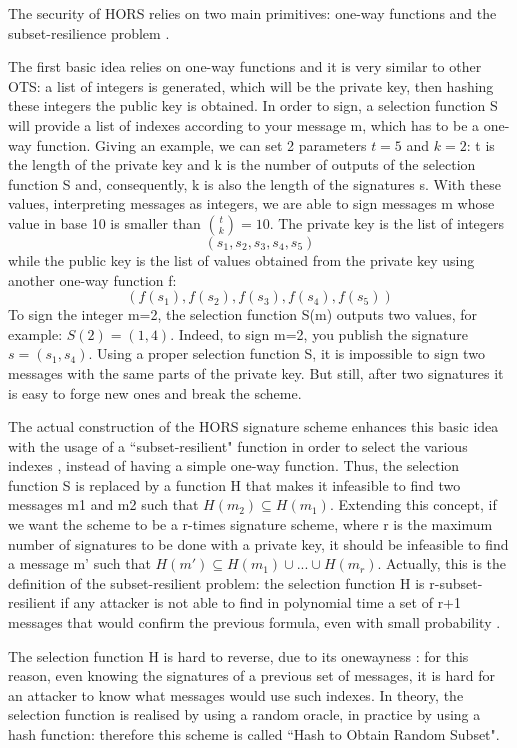 \documentclass[a4paper,12pt]{article}
\begin{document}
The security of HORS relies on two main primitives: one-way functions and the subset-resilience problem \cite{53_hbs}.

The first basic idea relies on one-way functions and it is very similar to other OTS: a list of integers is generated, which will be the private key, then hashing these integers the public key is obtained.
In order to sign, a selection function S will provide a list of indexes according to your message m, which has to be a one-way function.
Giving an example, we can set 2 parameters $t=5$ and $k=2$: t is the length of the private key and k is the number of outputs of the selection function S and, consequently, k is also the length of the signatures s.
With these values, interpreting messages as integers, we are able to sign messages m whose value in base 10 is smaller than $ {t \choose k} = 10 $.
The private key is the list of integers $$(s_{1}, s_{2}, s_{3}, s_{4}, s_{5})$$
while the public key is the list of values obtained from the private key using another one-way function f: $$(f(s_{1}), f(s_{2}), f(s_{3}),f(s_{4}),f(s_{5}))$$
To sign the integer m=2, the selection function S(m) outputs two values, for example: $S(2) = (1, 4)$. Indeed, to sign m=2, you publish the signature $s=(s_{1}, s_{4})$. Using a proper selection function S, it is impossible to sign two messages with the same parts of the private key. But still, after two signatures it is easy to forge new ones and break the scheme.

The actual construction of the HORS signature scheme enhances this basic idea with the usage of a ``subset-resilient" function in order to select the various indexes \cite{53_hbs}, instead of having a simple one-way function. Thus, the selection function S is replaced by a function H that makes it infeasible to find two messages m1 and m2 such that $H(m_{2}) \subseteq H(m_{1})$.
Extending this concept, if we want the scheme to be a r-times signature scheme, where r is the maximum number of signatures to be done with a private key, it should be infeasible to find a message m' such that $H(m') \subseteq H(m_{1})\cup...\cup H(m_{r})$. Actually, this is the definition of the subset-resilient problem: the selection function H is r-subset-resilient if any attacker is not able to find in polynomial time a set of r+1 messages that would confirm the previous formula, even with small probability \cite{53_hbs}.

The selection function H is hard to reverse, due to its onewayness \cite{53_hbs}: for this reason, even knowing the signatures of a previous set of messages, it is hard for an attacker to know what messages would use such indexes.
In theory, the selection function is realised by using a random oracle, in practice by using a hash function: therefore this scheme is called ``Hash to Obtain Random Subset".
\end{document}
